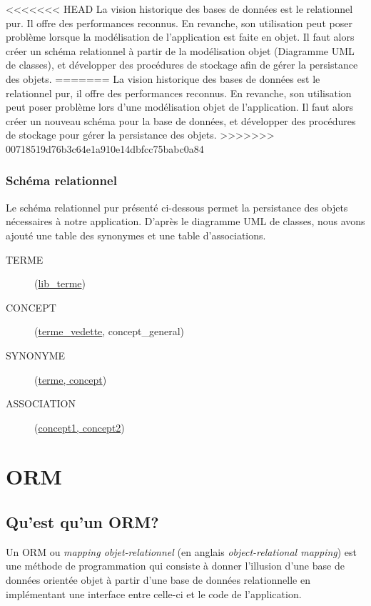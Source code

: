 <<<<<<< HEAD
La vision historique des bases de données est le relationnel pur. Il offre des performances reconnus. En revanche, son utilisation peut poser problème lorsque la modélisation de l'application est faite en objet. Il faut alors créer un schéma relationnel à partir de la modélisation objet (Diagramme UML de classes), et développer des procédures de stockage afin de gérer la persistance des objets.
=======
La vision historique des bases de données est le relationnel pur, il offre des performances reconnus. En revanche, son utilisation peut poser problème lors d'une modélisation objet de l'application. Il faut alors créer un nouveau schéma pour la base de données, et développer des procédures de stockage pour gérer la persistance des objets.
>>>>>>> 00718519d76b3c64e1a910e14dbfcc75babc0a84

\subsubsection{Schéma relationnel}

Le schéma relationnel pur présenté ci-dessous permet la persistance des objets nécessaires à notre application. D'après le diagramme UML de classes, nous avons ajouté une table des synonymes et une table d'associations.

\begin{description}
\item[TERME](\underline{lib\_terme})
\item[CONCEPT](\underline{terme\_vedette}\up{\#}, concept\_general\up{\#})
\item[SYNONYME](\underline{terme\up{\#}, concept\up{\#}})
\item[ASSOCIATION](\underline{concept1\up{\#}, concept2\up{\#}})
\end{description}

\section{ORM}

	\subsection{Qu'est qu'un ORM?}
    Un ORM ou \emph{mapping objet-relationnel} (en anglais \emph{object-relational mapping}) est une méthode de programmation qui consiste à donner l'illusion d'une base de données orientée objet à partir d'une base de données relationnelle en implémentant une interface entre celle-ci et le code de l'application.
   
